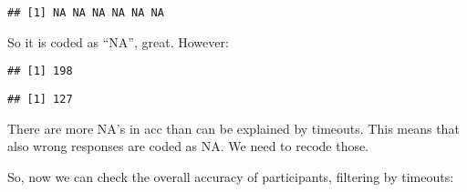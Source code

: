 \documentclass[
]{article}
\newenvironment{Shaded}{\begin{snugshade}}{\end{snugshade}}
\newcommand{\CommentTok}[1]{\textcolor[rgb]{0.56,0.35,0.01}{\textit{#1}}}
\newcommand{\DecValTok}[1]{\textcolor[rgb]{0.00,0.00,0.81}{#1}}
\newcommand{\KeywordTok}[1]{\textcolor[rgb]{0.13,0.29,0.53}{\textbf{#1}}}
\newcommand{\NormalTok}[1]{#1}
\newcommand{\OperatorTok}[1]{\textcolor[rgb]{0.81,0.36,0.00}{\textbf{#1}}}
\newcommand{\StringTok}[1]{\textcolor[rgb]{0.31,0.60,0.02}{#1}}
\begin{document}
\begin{Shaded}
\end{Shaded}

\begin{verbatim}
## [1] NA NA NA NA NA NA
\end{verbatim}

So it is coded as ``NA'', great. However:

\begin{Shaded}
\end{Shaded}

\begin{verbatim}
## [1] 198
\end{verbatim}

\begin{Shaded}
\end{Shaded}

\begin{verbatim}
## [1] 127
\end{verbatim}

There are more NA's in acc than can be explained by timeouts. This means
that also wrong responses are coded as NA. We need to recode those.

\begin{Shaded}
\end{Shaded}

So, now we can check the overall accuracy of participants, filtering by
timeouts:
\end{document}
